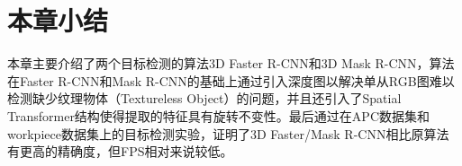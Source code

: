 \section{本章小结}
本章主要介绍了两个目标检测的算法3D Faster R-CNN和3D Mask R-CNN，算法在Faster R-CNN和Mask R-CNN的基础上通过引入深度图以解决单从RGB图难以检测缺少纹理物体（Textureless Object）的问题，并且还引入了Spatial Transformer结构使得提取的特征具有旋转不变性。最后通过在APC数据集和workpiece数据集上的目标检测实验，证明了3D Faster/Mask R-CNN相比原算法有更高的精确度，但FPS相对来说较低。


